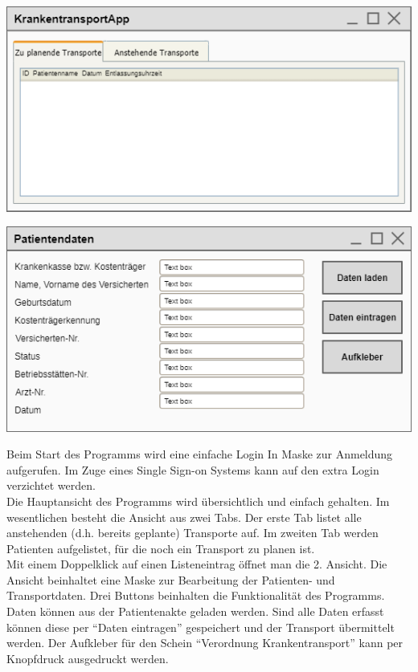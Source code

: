 \documentclass[a4paper, ngerman, 12pt]{scrartcl}
\begin{document}
\begin{center}
\begin{minipage}[b]{0.48\textwidth}
	\centering
	\includegraphics[width=\textwidth]{Bilder/mainpage_1.png}
	\label{img:zenger3}
\end{minipage}
\begin{minipage}[b]{0.48\textwidth}
	\centering
	\includegraphics[width=\textwidth]{Bilder/verordnungpage.png}
	\label{img:zenger4}
\end{minipage}
\end{center}
Beim Start des Programms wird eine einfache Login In Maske zur Anmeldung aufgerufen. Im Zuge eines Single Sign-on Systems kann auf den extra Login verzichtet werden.\\
Die Hauptansicht des Programms wird übersichtlich und einfach gehalten. Im wesentlichen besteht die Ansicht aus zwei Tabs. Der erste Tab listet alle anstehenden (d.h. bereits geplante) Transporte auf. Im zweiten Tab werden Patienten aufgelistet, für die noch ein Transport zu planen ist.\\
Mit einem Doppelklick auf einen Listeneintrag öffnet man die 2. Ansicht. Die Ansicht beinhaltet eine Maske zur Bearbeitung der Patienten- und Transportdaten. Drei Buttons beinhalten die Funktionalität des Programms. Daten können aus der Patientenakte geladen werden. Sind alle Daten erfasst können diese per ``Daten eintragen'' gespeichert und der Transport übermittelt werden. Der Aufkleber für den Schein ``Verordnung Krankentransport'' kann per Knopfdruck ausgedruckt werden.
\end{document}
